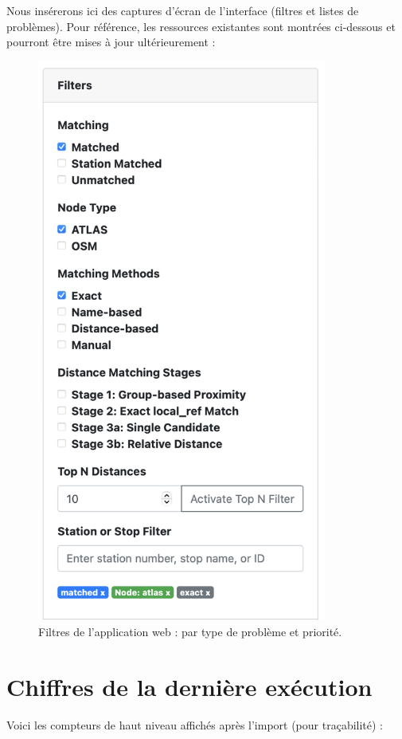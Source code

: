 \noindent Nous insérerons ici des captures d'écran de l'interface (filtres et listes de problèmes). Pour référence, les ressources existantes sont montrées ci-dessous et pourront être mises à jour ultérieurement :

\begin{figure}[h]
  \centering
  \includegraphics[width=0.85\textwidth]{../figures/webapp/filters.png}
  \caption{Filtres de l'application web : par type de problème et priorité.}
\end{figure}

\section{Chiffres de la dernière exécution}
Voici les compteurs de haut niveau affichés après l'import (pour traçabilité) :

